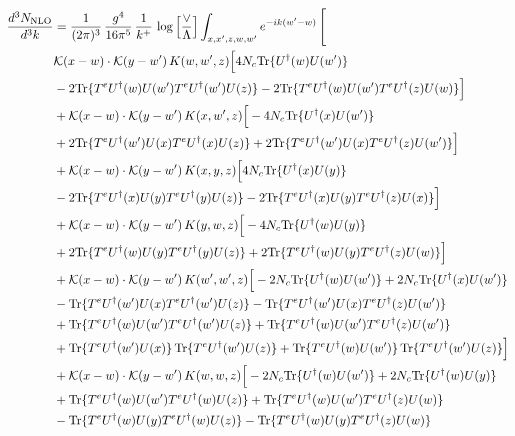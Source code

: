 \documentclass[9pt]{article}
\numberwithin{equation}{section}
\begin{document}
\begin{align}
    \frac{d^{3}N_{\mathrm{NLO}}}{d^{3}k} & = \frac{1}{(2\pi)^{3}}\,\frac{g^{4}}{16\pi^{5}}\,\frac{1}{k^{+}}\,\log\Big[\frac{\vee}{\Lambda}\Big]\int_{x,x',z,w,w'}e^{-ik(w'-w)}\,\Bigg[\notag \\ & \mathcal K(x-w)\cdot\mathcal K(y-w')\,K(w,w',z)\Big[4 N_c{\rm Tr}\{U^\dagger(w)U(w')\}\notag\\
&-2{\rm Tr}\{T^eU^\dagger(w)U(w')T^eU^\dagger(w')U(z)\}-2{\rm Tr}\{T^eU^\dagger(w)U(w')T^eU^\dagger(z)U(w)\}\Big]\notag\\
&+\mathcal K(x-w)\cdot\mathcal K(y-w')\,K(x,w',z)\Big[-4 N_c{\rm Tr}\{U^\dagger(x)U(w')\}\notag\\
&+2{\rm Tr}\{T^eU^\dagger(w')U(x)T^eU^\dagger(x)U(z)\}+2{\rm Tr}\{T^eU^\dagger(w')U(x)T^eU^\dagger(z)U(w')\}\Big]\notag\\
&+\mathcal K(x-w)\cdot\mathcal K(y-w')\,K(x,y,z)\Big[4 N_c{\rm Tr}\{U^\dagger(x)U(y)\}\notag\\
&-2{\rm Tr}\{T^eU^\dagger(x)U(y)T^eU^\dagger(y)U(z)\}-2{\rm Tr}\{T^eU^\dagger(x)U(y)T^eU^\dagger(z)U(x)\}\Big]\notag\\
&+\mathcal K(x-w)\cdot\mathcal K(y-w')\,K(y,w,z)\Big[-4 N_c{\rm Tr}\{U^\dagger(w)U(y)\}\notag\\
&+2{\rm Tr}\{T^eU^\dagger(w)U(y)T^eU^\dagger(y)U(z)\}+2{\rm Tr}\{T^eU^\dagger(w)U(y)T^eU^\dagger(z)U(w)\}\Big]\notag\\
&+\mathcal K(x-w)\cdot\mathcal K(y-w')\,K(w',w',z)\Big[-2 N_c{\rm Tr}\{U^\dagger(w)U(w')\}+2 N_c{\rm Tr}\{U^\dagger(x)U(w')\}\notag\\
&-{\rm Tr}\{T^eU^\dagger(w')U(x)T^eU^\dagger(w')U(z)\}-{\rm Tr}\{T^eU^\dagger(w')U(x)T^eU^\dagger(z)U(w')\}\notag\\
&+{\rm Tr}\{T^eU^\dagger(w)U(w')T^eU^\dagger(w')U(z)\}+{\rm Tr}\{T^eU^\dagger(w)U(w')T^eU^\dagger(z)U(w')\}\notag\\
&+{\rm Tr}\{T^eU^\dagger(w')U(x)\}\,{\rm Tr}\{T^eU^\dagger(w')U(z)\}+{\rm Tr}\{T^eU^\dagger(w)U(w')\}\,{\rm Tr}\{T^eU^\dagger(w')U(z)\}\Big]\notag\\
&+\mathcal K(x-w)\cdot\mathcal K(y-w')\,K(w,w,z)\Big[-2 N_c{\rm Tr}\{U^\dagger(w)U(w')\}+2 N_c{\rm Tr}\{U^\dagger(w)U(y)\}\notag\\
&+{\rm Tr}\{T^eU^\dagger(w)U(w')T^eU^\dagger(w)U(z)\}+{\rm Tr}\{T^eU^\dagger(w)U(w')T^eU^\dagger(z)U(w)\}\notag\\
&-{\rm Tr}\{T^eU^\dagger(w)U(y)T^eU^\dagger(w)U(z)\}-{\rm Tr}\{T^eU^\dagger(w)U(y)T^eU^\dagger(z)U(w)\}\notag\\

\end{align}
\end{document}
